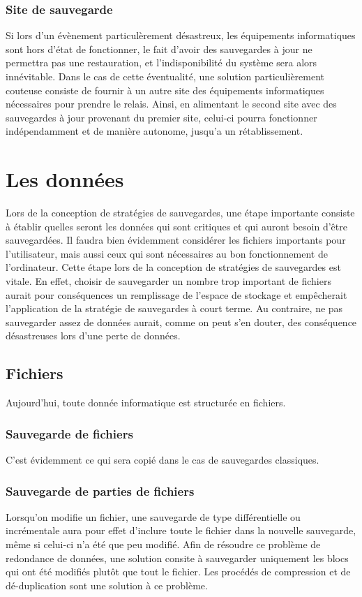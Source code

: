 \documentclass[a4paper,11pt]{report}
\begin{document}
\subsection{Site de sauvegarde}
Si lors d'un évènement particulèrement désastreux, les équipements informatiques sont hors d'état de fonctionner, le fait d'avoir des sauvegardes à jour ne permettra pas une restauration, et l'indisponibilité du système sera alors innévitable.
Dans le cas de cette éventualité, une solution particulièrement couteuse consiste de fournir à un autre site des équipements informatiques nécessaires pour prendre le relais.
Ainsi, en alimentant le second site avec des sauvegardes à jour provenant du premier site, celui-ci pourra fonctionner indépendamment et de manière autonome, jusqu'a un rétablissement.


\chapter{Les données}
Lors de la conception de stratégies de sauvegardes, une étape importante consiste à établir quelles seront les données qui sont critiques et qui auront besoin d'être sauvegardées.
Il faudra bien évidemment considérer les fichiers importants pour l'utilisateur, mais aussi ceux qui sont nécessaires au bon fonctionnement de l'ordinateur.
Cette étape lors de la conception de stratégies de sauvegardes est vitale. En effet, choisir de sauvegarder un nombre trop important de fichiers aurait pour conséquences un remplissage de l'espace de stockage et empêcherait l'application de la stratégie de sauvegardes à court terme.
Au contraire, ne pas sauvegarder assez de données aurait, comme on peut s'en douter, des conséquence désastreuses lors d'une perte de données.

\section{Fichiers}
Aujourd'hui, toute donnée informatique est structurée en fichiers.

\subsection{Sauvegarde de fichiers}
C'est évidemment ce qui sera copié dans le cas de sauvegardes classiques.

\subsection{Sauvegarde de parties de fichiers}
Lorsqu'on modifie un fichier, une sauvegarde de type différentielle ou incrémentale aura pour effet d'inclure toute le fichier dans la nouvelle sauvegarde, même si celui-ci n'a été que peu modifié.
Afin de résoudre ce problème de redondance de données, une solution consite à sauvegarder uniquement les blocs qui ont été modifiés plutôt que tout le fichier.
Les procédés de compression et de dé-duplication sont une solution à ce problème.
\end{document}
